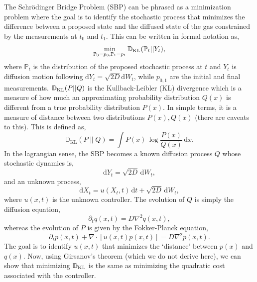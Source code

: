 \documentclass[11pt]{article}
\def\d{\mathrm{d}}
\def\d{\text{d}}
\def\grad{\vec{\nabla}}
\def\grad{\nabla}
\def\P{\mathbb{P}}
\def\D{\mathbb{D}}
\begin{document}
\begin{singlespace}
The Schr\"odinger Bridge Problem (SBP) can be phrased as a minimization problem where the goal is to identify the stochastic process that minimizes the difference between a proposed state and the diffused state of the gas constrained by the measurements at $t_0$ and $t_1$. This can be written in formal notation as,
\[
\min_{\P_0=p_0, \P_1=p_1} \D_{\rm KL} (\P_t||Y_t),
\]
where $\P_t$ is the distribution of the proposed stochastic process at $t$ and $Y_t$ is diffusion motion following $\d Y_t = \sqrt{2D} \d W_t$, while $p_{0, 1}$ are the initial and final measurements. $\D_{\rm KL}(P||Q)$ is the Kullback-Leibler (KL) divergence which is a measure of how much an approximating probability distribution $Q(x)$ is different from a true probability distribution $P(x)$. In simple terms, it is a measure of distance between two distributions $P(x), Q(x)$ (there are caveats to this). This is defined as,
\[
\D_{\text{KL}}(P\parallel Q)= \int P(x)\,\log {\frac {P(x)}{Q(x)}}\,\d x.
\]
In the lagrangian sense, the SBP becomes a known diffusion process $Q$ whose stochastic dynamics is,
\[
\d Y_t = \sqrt{2D}\,\d W_t,
\]
and an unknown process,
\[
\d X_t = u(X_t, t)\,\d t + \sqrt{2D}\,\d W_t,
\]
where $u(x, t)$ is the unknown controller. The evolution of $Q$ is simply the diffusion equation,
\begin{equation}
    \partial_t q(x, t) = D \grad^2 q(x, t),
    \label{eq:DiffFP}
\end{equation}
whereas the evolution of $P$ is given by the Fokker-Planck equation,
\begin{equation}
    \partial_t p(x, t) + \grad \cdot [u(x, t) p(x, t)] = D \grad^2 p(x, t).
    \label{eq:SBPFP}
\end{equation}
The goal is to identify $u(x, t)$ that minimizes the `distance' between $p(x)$ and $q(x)$. Now, using Girsanov's theorem (which we do not derive here), we can show that minimizing $\D_{\rm KL}$ is the same as minimizing the quadratic cost associated with the controller.\\


\end{singlespace}
\end{document}

